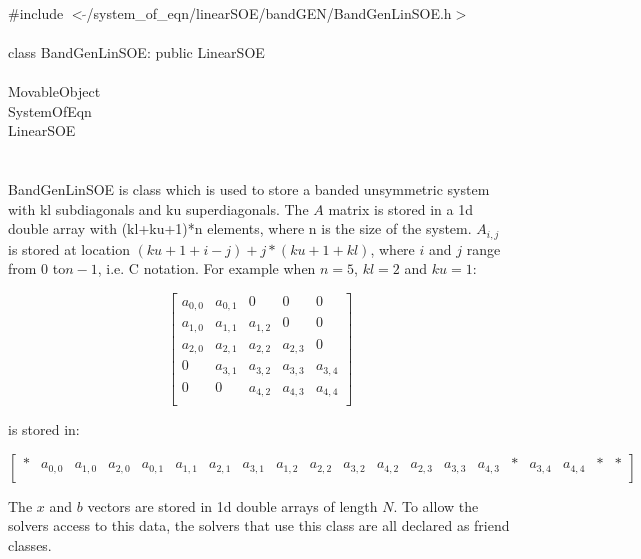 
   \\
\indent \#include $<\tilde{ }$/system\_of\_eqn/linearSOE/bandGEN/BandGenLinSOE.h$>$  \\

  \\
\indent class BandGenLinSOE: public LinearSOE \\

 \\
\indent MovableObject \\
\indent\indent SystemOfEqn \\
\indent\indent\indent LinearSOE \\
\indent\indent\indent{} \\

  \\
\indent BandGenLinSOE is class which is used to store a banded
unsymmetric system with kl subdiagonals and ku superdiagonals. The $A$
matrix is stored in a 1d double array with (kl+ku+1)*n elements, where
n is the size of the system. $A_{i,j}$ is stored at location
$(ku+1+i-j) + j*(ku+1+kl)$, where $i$ and $j$ range from $0$ to$n-1$, i.e. C
notation. For example when $n=5$, $kl = 2$ and $ku=1$: 

$$
\left[
\begin{array}{ccccc}
a_{0,0} & a_{0,1}  & 0 & 0 & 0 \\
a_{1,0} & a_{1,1} & a_{1,2} & 0 & 0 \\
a_{2,0} & a_{2,1} & a_{2,2} & a_{2,3} & 0  \\
0 & a_{3,1} & a_{3,2} & a_{3,3} & a_{3,4} \\
0 & 0 & a_{4,2} & a_{4,3} & a_{4,4} \\
\end{array}
\right] 
$$

is stored in:

$$
\left[
\begin{array}{ccccccccccccccccccccc}
* & a_{0,0} & a_{1,0}  & a_{2,0} & a_{0,1} & a_{1,1} & a_{2,1} &
a_{3,1} & a_{1,2} & a_{2,2} & a_{3,2} & a_{4,2} & a_{2,3} & a_{3,3} &
a_{4,3} & * & a_{3,4} & a_{4,4} & * & * \\
\end{array}
\right] 
$$

The $x$ and $b$ vectors are stored in 1d double arrays of length
$N$. To allow the solvers access to this data, the solvers that use
this class are all declared as friend classes. \\ 


